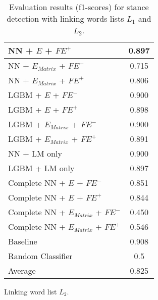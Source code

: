 \begin{table}[h]
\begin{subtable}{.5\textwidth}
\begin{tabular}{|| l || c ||}
 			NN + $E$ + $\textit{FE}^+$ & 0.897 \\
 			\hline
 			NN + $E_{Matrix}$ + $\textit{FE}^-$ & 0.715 \\
 			\hline
 			NN + $E_{Matrix}$ + $\textit{FE}^+$ & 0.806 \\
 			\hline
 			LGBM + $E$ + $\textit{FE}^-$ & 0.900 \\
 			\hline
 			LGBM + $E$ + $\textit{FE}^+$ & 0.898 \\
 			\hline
 			LGBM + $E_{Matrix}$ + $\textit{FE}^-$ & 0.900 \\
 			\hline
 			LGBM + $E_{Matrix}$ + $\textit{FE}^+$ & 0.891 \\
 			\hline
 			NN + LM only & 0.900 \\
 			\hline
 			LGBM + LM only & 0.897 \\
 			\hline
 			Complete NN + $E$ + $\textit{FE}^-$ & 0.851 \\
 			\hline
 			Complete NN + $E$ + $\textit{FE}^+$ & 0.844 \\
 			\hline
 			Complete NN + $E_{Matrix}$ + $\textit{FE}^-$ & 0.450 \\
 			\hline
 			Complete NN + $E_{Matrix}$ + $\textit{FE}^+$ & 0.546 \\
 			\hline
 			Baseline & 0.908 \\
 			\hline
 			Random Classifier & 0.5 \\
 			\hline
 			\hline
 			Average & 0.825 \\
 			\hline
		\end{tabular}
		\renewcommand{\arraystretch}{1}
  		\caption{Linking word list $L_2$.}%
  	\end{subtable}
  	\caption{Evaluation results (f1-scores) for stance detection with linking words lists $L_1$ and $L_2$.}%
  	\label{fig:stanceresults}
\end{table}

